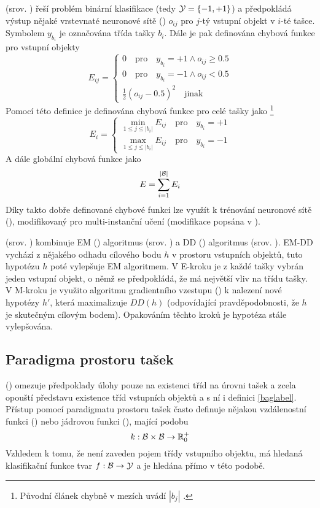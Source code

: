  (srov. \cite{zhou_neural_2002}) řeší problém binární klasifikace (tedy \( \mathcal Y = \left\{ -1, +1 \right\} \)) a předpokládá výstup nějaké vrstevnaté neuronové sítě () \( o_{ij} \) pro \(j\)-tý vstupní objekt v \(i\)-té tašce. Symbolem \( y_{b_i} \) je označována třída tašky \( b_i \). Dále je pak definována chybová funkce pro vstupní objekty
\[ E_{ij} = \begin{cases}
	0 \quad \text{pro} \quad y_{b_i} = +1 \land o_{ij} \geq 0.5 \\
	0 \quad \text{pro} \quad y_{b_i} = -1 \land o_{ij} < 0.5 \\
	\frac{1}{2} \left( o_{ij} - 0.5 \right)^2 \quad \text{jinak}
\end{cases} \]
Pomocí této definice je definována chybová funkce pro celé tašky jako \footnote{Původní článek chybně v mezích uvádí \( \left| b_j \right| \) .}
\[ E_i = \begin{cases}
	\min_{1 \leq j \leq \left| b_i \right|} E_{ij} \quad \text{pro} \quad y_{b_i} = +1 \\
	\max_{1 \leq j \leq \left| b_i \right|} E_{ij} \quad \text{pro} \quad y_{b_i} = -1
\end{cases} \]
A dále globální chybová funkce jako
\[ E = \sum_{i = 1}^{\left| \mathcal B \right|} E_i \]
Díky takto dobře definované chybové funkci lze využít k trénování neuronové sítě  (), modifikovaný pro multi-instanční učení (modifikace popsána v \cite{zhou_neural_2002}).

 (srov. \cite{zhang_em-dd:_2002}) kombinuje EM () algoritmus (srov. \cite{dempster_maximum_1977}) a DD () algoritmus (srov. \cite{maron_framework_1998}). EM-DD vychází z nějakého odhadu cílového bodu \( h \) v prostoru vstupních objektů, tuto hypotézu \( h \) poté vylepšuje EM algoritmem. V E-kroku je z každé tašky vybrán jeden vstupní objekt, o němž se předpokládá, že má největší vliv na třídu tašky. V M-kroku je využito algoritmu gradientního vzestupu () k nalezení nové hypotézy \( h' \), která maximalizuje \( DD \left( h \right) \) (odpovídající pravděpodobnosti, že \( h \) je skutečným cílovým bodem). Opakováním těchto kroků je hypotéza stále vylepšována.


\subsection{Paradigma prostoru tašek}
 () omezuje předpoklady úlohy  pouze na existenci tříd na úrovni tašek a zcela opouští představu existence tříd vstupních objektů a s ní i definici \ref{baglabel}. Přístup pomocí paradigmatu prostoru tašek často definuje nějakou vzdálenostní funkci () nebo jádrovou funkci (), mající podobu
\[ k : \mathcal B \times \mathcal B \to \mathbb R_0^+ \]
Vzhledem k tomu, že není zaveden pojem třídy vstupního objektu, má hledaná klasifikační funkce tvar \( f : \mathcal B \to \mathcal Y \) a je hledána přímo v této podobě.

